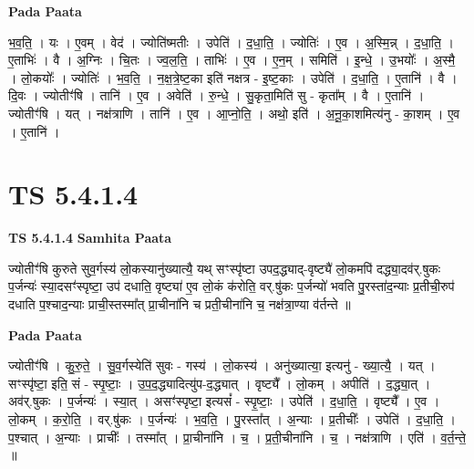 \documentclass[17pt]{extarticle}
\begin{document}
\textbf{Pada Paata} \newline

भ॒व॒ति॒ । यः । ए॒वम् । वेद॑ । ज्योति॑ष्मतीः । उपेति॑ । द॒धा॒ति॒ । ज्योतिः॑ । ए॒व । अ॒स्मि॒न्न् । द॒धा॒ति॒ । ए॒ताभिः॑ । वै । अ॒ग्निः । चि॒तः । ज्व॒ल॒ति॒ । ताभिः॑ । ए॒व । ए॒न॒म् । समिति॑ । इ॒न्धे॒ । उ॒भयोः᳚ । अ॒स्मै॒ । लो॒कयोः᳚ । ज्योतिः॑ । भ॒व॒ति॒ । न॒क्ष॒त्रे॒ष्ट॒का इति॑ नक्षत्र - इ॒ष्ट॒काः । उपेति॑ । द॒धा॒ति॒ । ए॒तानि॑ । वै । दि॒वः । ज्योतीꣳ॑षि । तानि॑ । ए॒व । अवेति॑ । रु॒न्धे॒ । सु॒कृता॒मिति॑ सु - कृता᳚म् । वै । ए॒तानि॑ । ज्योतीꣳ॑षि । यत् । नक्ष॑त्राणि । तानि॑ । ए॒व । आ॒प्नो॒ति॒ । अथो॒ इति॑ । अ॒नू॒का॒शमित्य॑नु - का॒शम् । ए॒व । ए॒तानि॑ ।  \newline




\section*{ TS 5.4.1.4 }

\textbf{TS 5.4.1.4 } \newline
\textbf{Samhita Paata} \newline

ज्योतीꣳ॑षि कुरुते सुव॒र्गस्य॑ लो॒कस्यानु॑ख्यात्यै॒ यथ् सꣳस्पृ॑ष्टा उपद॒द्ध्याद्-वृष्ट्यै॑ लो॒कमपि॑ दद्ध्या॒दव॑र्.षुकः प॒र्जन्यः॑ स्या॒दसꣳ॑स्पृष्टा॒ उप॑ दधाति॒ वृष्ट्या॑ ए॒व लो॒कं क॑रोति॒ वर्.षु॑कः प॒र्जन्यो॑ भवति पु॒रस्ता॑द॒न्याः प्र॒तीची॒रुप॑ दधाति प॒श्चाद॒न्याः प्राची॒स्तस्मा᳚त् प्रा॒चीना॑नि च प्रती॒चीना॑नि च॒ नक्ष॑त्रा॒ण्या व॑र्तन्ते ॥ \newline

\textbf{Pada Paata} \newline

ज्योतीꣳ॑षि । कु॒रु॒ते॒ । सु॒व॒र्गस्येति॑ सुवः - गस्य॑ । लो॒कस्य॑ । अनु॑ख्यात्या॒ इत्यनु॑ - ख्या॒त्यै॒ । यत् । सꣳस्पृ॑ष्टा॒ इति॒ सं - स्पृ॒ष्टाः॒ । उ॒प॒द॒द्ध्यादित्यु॑प-द॒द्ध्यात् । वृष्ट्यै᳚ । लो॒कम् । अपीति॑ । द॒द्ध्या॒त् । अव॑र्.षुकः । प॒र्जन्यः॑ । स्या॒त् । असꣳ॑स्पृष्टा॒ इत्यसं᳚ - स्पृ॒ष्टाः॒ । उपेति॑ । द॒धा॒ति॒ । वृष्ट्यै᳚ । ए॒व । लो॒कम् । क॒रो॒ति॒ । वर्.षु॑कः । प॒र्जन्यः॑ । भ॒व॒ति॒ । पु॒रस्ता᳚त् । अ॒न्याः । प्र॒तीचीः᳚ । उपेति॑ । द॒धा॒ति॒ । प॒श्चात् । अ॒न्याः । प्राचीः᳚ । तस्मा᳚त् । प्रा॒चीना॑नि । च॒ । प्र॒ती॒चीना॑नि । च॒ । नक्ष॑त्राणि । एति॑ । व॒र्त॒न्ते॒ ॥  \newline




\end{document}
